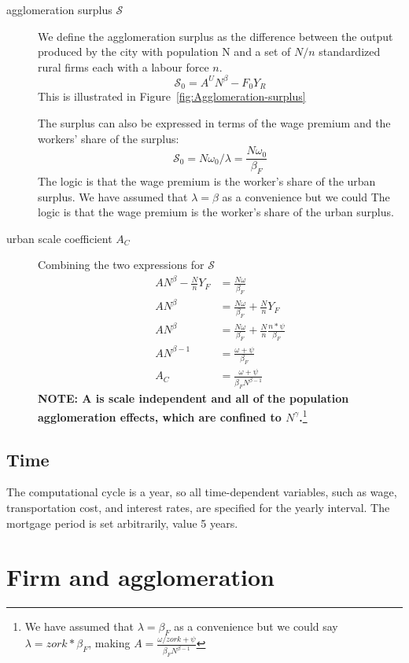 \begin{description}
\item [agglomeration surplus $\mathcal{S}$] We define the agglomeration surplus as the difference between the output produced by  the city with population N and a set of $N/n$ standardized rural firms each with a labour force $n$. 
\[\mathcal{S_0}=A^U N^\beta-F_0Y_R \] 
This is illustrated in Figure~\ref{fig:Agglomeration-surplus}

The surplus can also be expressed in terms of the wage premium and the workers' share of the surplus:
\[\mathcal{S_0}=N\omega_0/\lambda=\frac{N\omega_0}{\beta_F}\] 
The logic is that the wage premium is the worker's share of the urban surplus. We have assumed that $\lambda=\beta$ as a convenience but we could 
The logic is that the wage premium is the worker's share of the urban surplus. 

\item[urban scale coefficient $A_C$] Combining the two expressions for $\mathcal{S}$
\begin{align*}
 AN^\beta-\frac{N}{n}Y_F    &=\frac{N\omega}{\beta_F}\\ 
 AN^\beta   &=\frac{N\omega}{\beta_F} + \frac{N}{n}Y_F \\
 AN^\beta   &=\frac{N\omega}{\beta_F} + \frac{N}{n}\frac{n*\psi}{\beta_F}\\
AN^{\beta-1}   &=\frac{\omega+\psi}{\beta_F}\\ 
  A_C&=\frac{\omega+\psi}{\beta_FN^{\beta-1}}
\end{align*}
\textbf{NOTE: A is scale independent and all of the population agglomeration effects, which are confined to $N^\gamma$.}\footnote{We have assumed that $\lambda=\beta_F$ as a convenience but we could say $\lambda=zork*\beta_F$, making $A=\frac{\omega/zork +\psi}{\beta_FN^{\beta-1}}$ }
\end{description}


\subsection{Time}
 The computational cycle is a year, so all time-dependent variables, such as wage, transportation cost, and interest rates, are specified for the yearly interval. The mortgage period is set arbitrarily, value 5 years. 




 
\section{Firm and agglomeration}

